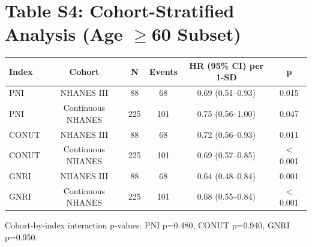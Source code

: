 \documentclass[11pt,a4paper]{article}
\begin{document}
\section*{Table S4: Cohort-Stratified Analysis (Age $\ge$60 Subset)}
\label{tab:s4}
\begin{center}
\begin{tabular}{lccccc}
\toprule
Index & Cohort & N & Events & HR (95\% CI) per 1-SD & p \\
\midrule
PNI   & NHANES III & 88 & 68 & 0.69 (0.51--0.93) & 0.015 \\
PNI   & Continuous NHANES & 225 & 101 & 0.75 (0.56--1.00) & 0.047 \\
CONUT & NHANES III & 88 & 68 & 0.72 (0.56--0.93) & 0.011 \\
CONUT & Continuous NHANES & 225 & 101 & 0.69 (0.57--0.85) & $<$0.001 \\
GNRI  & NHANES III & 88 & 68 & 0.64 (0.48--0.84) & 0.001 \\
GNRI  & Continuous NHANES & 225 & 101 & 0.68 (0.55--0.84) & $<$0.001 \\
\bottomrule
\end{tabular}
\end{center}

Cohort-by-index interaction p-values: PNI p=0.480, CONUT p=0.940, GNRI p=0.950.

\end{document}
